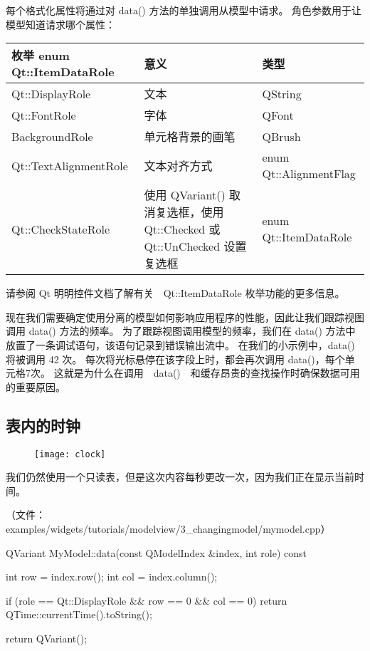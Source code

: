 每个格式化属性将通过对 data() 方法的单独调用从模型中请求。
角色参数用于让模型知道请求哪个属性：

\begin{tabular}{|l|m{15em}|l|}
	\hline
	枚举 enum Qt::ItemDataRole & 意义 &类型 \\
	\hline
	Qt::DisplayRole	 & 文本	 &QString \\
	\hline
	Qt::FontRole	& 字体	&QFont\\ 
	\hline
	BackgroundRole &	单元格背景的画笔	& QBrush\\ 
	\hline
	Qt::TextAlignmentRole	& 文本对齐方式 &enum Qt::AlignmentFlag \\
	\hline 
	Qt::CheckStateRole &	使用 QVariant() 取消复选框，使用 Qt::Checked 或 Qt::UnChecked 设置复选框 &	enum Qt::ItemDataRole \\
	\hline
\end{tabular}

请参阅 Qt 明明控件文档了解有关　Qt::ItemDataRole 枚举功能的更多信息。

现在我们需要确定使用分离的模型如何影响应用程序的性能，因此让我们跟踪视图调用 data() 方法的频率。
为了跟踪视图调用模型的频率，我们在 data() 方法中放置了一条调试语句，该语句记录到错误输出流中。
在我们的小示例中，data() 将被调用 42 次。
每次将光标悬停在该字段上时，都会再次调用 data()，每个单元格7次。
这就是为什么在调用　data()　和缓存昂贵的查找操作时确保数据可用的重要原因。

\subsection{表内的时钟}

\begin{figure}[hbt!]  
\texttt{[image: clock]}
\end{figure}

我们仍然使用一个只读表，但是这次内容每秒更改一次，因为我们正在显示当前时间。

（文件：examples/widgets/tutorials/modelview/3\_changingmodel/mymodel.cpp）

\begin{cppcode}
QVariant MyModel::data(const QModelIndex &index, int role) const
{
    int row = index.row();
    int col = index.column();

    if (role == Qt::DisplayRole && row == 0 && col == 0)
        return QTime::currentTime().toString();

    return QVariant();
}
\end{cppcode}

